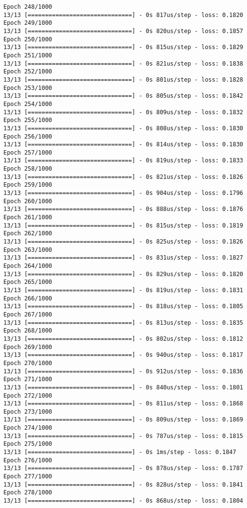 \documentclass[11pt]{article}
\begin{document}
\begin{Verbatim}[commandchars=\\\{\}]
Epoch 248/1000
13/13 [==============================] - 0s 817us/step - loss: 0.1820
Epoch 249/1000
13/13 [==============================] - 0s 820us/step - loss: 0.1857
Epoch 250/1000
13/13 [==============================] - 0s 815us/step - loss: 0.1829
Epoch 251/1000
13/13 [==============================] - 0s 821us/step - loss: 0.1838
Epoch 252/1000
13/13 [==============================] - 0s 801us/step - loss: 0.1828
Epoch 253/1000
13/13 [==============================] - 0s 805us/step - loss: 0.1842
Epoch 254/1000
13/13 [==============================] - 0s 809us/step - loss: 0.1832
Epoch 255/1000
13/13 [==============================] - 0s 808us/step - loss: 0.1830
Epoch 256/1000
13/13 [==============================] - 0s 814us/step - loss: 0.1830
Epoch 257/1000
13/13 [==============================] - 0s 819us/step - loss: 0.1833
Epoch 258/1000
13/13 [==============================] - 0s 821us/step - loss: 0.1826
Epoch 259/1000
13/13 [==============================] - 0s 904us/step - loss: 0.1796
Epoch 260/1000
13/13 [==============================] - 0s 888us/step - loss: 0.1876
Epoch 261/1000
13/13 [==============================] - 0s 815us/step - loss: 0.1819
Epoch 262/1000
13/13 [==============================] - 0s 825us/step - loss: 0.1826
Epoch 263/1000
13/13 [==============================] - 0s 831us/step - loss: 0.1827
Epoch 264/1000
13/13 [==============================] - 0s 829us/step - loss: 0.1820
Epoch 265/1000
13/13 [==============================] - 0s 819us/step - loss: 0.1831
Epoch 266/1000
13/13 [==============================] - 0s 818us/step - loss: 0.1805
Epoch 267/1000
13/13 [==============================] - 0s 813us/step - loss: 0.1835
Epoch 268/1000
13/13 [==============================] - 0s 802us/step - loss: 0.1812
Epoch 269/1000
13/13 [==============================] - 0s 940us/step - loss: 0.1817
Epoch 270/1000
13/13 [==============================] - 0s 912us/step - loss: 0.1836
Epoch 271/1000
13/13 [==============================] - 0s 840us/step - loss: 0.1801
Epoch 272/1000
13/13 [==============================] - 0s 811us/step - loss: 0.1868
Epoch 273/1000
13/13 [==============================] - 0s 809us/step - loss: 0.1869
Epoch 274/1000
13/13 [==============================] - 0s 787us/step - loss: 0.1815
Epoch 275/1000
13/13 [==============================] - 0s 1ms/step - loss: 0.1847
Epoch 276/1000
13/13 [==============================] - 0s 878us/step - loss: 0.1787
Epoch 277/1000
13/13 [==============================] - 0s 828us/step - loss: 0.1841
Epoch 278/1000
13/13 [==============================] - 0s 868us/step - loss: 0.1804

\end{Verbatim}
\end{document}
